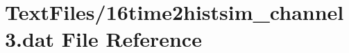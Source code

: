 \hypertarget{16time2histsim__channel3_8dat}{}\section{Text\+Files/16time2histsim\+\_\+channel3.dat File Reference}
\label{16time2histsim__channel3_8dat}
